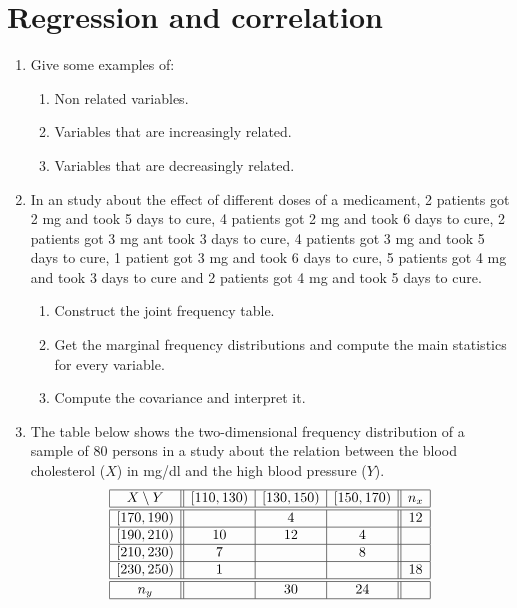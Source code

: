 
\section{Regression and correlation}
\begin{enumerate}[leftmargin=*,resume]
\item Give some examples of:
\begin{enumerate}
\item Non related variables.
\item Variables that are increasingly related.
\item Variables that are decreasingly related.
\end{enumerate}

\item In an study about the effect of different doses of a medicament, 2 patients got 2 mg and took 5 days to cure, 4
patients got 2 mg and took 6 days to cure, 2 patients got 3 mg ant took 3 days to cure, 4 patients got 3 mg and took 5
days to cure, 1 patient got 3 mg and took 6 days to cure, 5 patients got 4 mg and took 3 days to cure and 2 patients got
4 mg and took 5 days to cure. 
\begin{enumerate}
\item Construct the joint frequency table.
\item Get the marginal frequency distributions and compute the main statistics for every variable. 
\item Compute the covariance and interpret it. 
\end{enumerate}

\item The table below shows the two-dimensional frequency distribution of a sample of 80 persons in a study about the
relation between the blood cholesterol ($X$) in mg/dl and the high blood pressure ($Y$).
\[
\begin{array}{|c||c|c|c||c|}
\hline
X\setminus Y & [110,130) & [130,150) & [150,170) & n_x \\
\hline\hline
[170,190)   &           &     4     &           & 12\\
\hline
[190,210)   &    10     &    12     &     4     &   \\
\hline
[210,230)   &     7     &           &     8     &   \\
\hline
[230,250)   &     1     &           &           & 18\\
\hline\hline
n_y          &           &    30     &    24    &    \\
\hline
\end{array}
\]


\end{enumerate}
